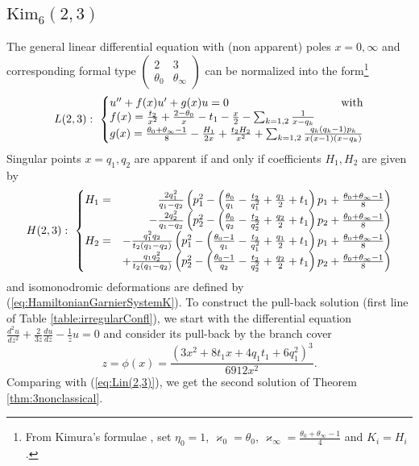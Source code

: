 \documentclass[12]{amsart}
\begin{document}
\subsection{$\mathrm{Kim}_6(2,3)$}
The general linear differential equation with (non apparent) poles $x=0,\infty$
and corresponding formal type $\begin{pmatrix}2&3\\ \theta_0&\theta_\infty\end{pmatrix}$ can be normalized into the form\footnote{From Kimura's formulae \cite{Kimura}, set $\eta_0=1$, 
$\varkappa_0=\theta_0$, $\varkappa_\infty=\frac{\theta_0+\theta_\infty-1}{4}$
and $K_i=H_i$.}
\begin{equation}\label{eq:Lin(2,3)}
L(2,3):\ \left\{\begin{matrix}u''+f(x)u'+g(x)u=0\ \ \ \hfill\text{with}\\
f(x)=\frac{t_2}{x^2}+\frac{2-\theta_0}{x}-t_1-\frac{x}{2}-\sum_{k=1,2}\frac{1}{x-q_k}\hfill\hfill\\
g(x)=\frac{\theta_0+\theta_\infty-1}{8}-\frac{H_1}{2x}+\frac{t_2H_2}{x^2}+\sum_{k=1,2}\frac{q_k(q_k-1)p_k}{x(x-1)(x-q_k)}
\end{matrix}\right.
\end{equation}
Singular points $x=q_1,q_2$ are apparent if and only if coefficients $H_1,H_2$ are given by
\begin{equation}\label{eq:Ham(2,3)}
H(2,3):\ \left\{\begin{matrix}
H_1=&\hfill\frac{2q_1^2}{q_1-q_2}\left(p_1^2-\left(\frac{\theta_0}{q_1}-\frac{t_2}{q_1^2}+\frac{q_1}{2}+t_1\right)p_1+\frac{\theta_0+\theta_\infty-1}{8}\right)\\
&\hfill-\frac{2q_2^2}{q_1-q_2}\left(p_2^2-\left(\frac{\theta_0}{q_2}-\frac{t_2}{q_2^2}+\frac{q_2}{2}+t_1\right)p_2+\frac{\theta_0+\theta_\infty-1}{8}\right)\\
H_2=&-\frac{q_1^2q_2}{t_2(q_1-q_2)}\left(p_1^2-\left(\frac{\theta_0-1}{q_1}-\frac{t_2}{q_1^2}+\frac{q_1}{2}+t_1\right)p_1+\frac{\theta_0+\theta_\infty-1}{8}\right)\\
&\hfill+\frac{q_1q_2^2}{t_2(q_1-q_2)}\left(p_2^2-\left(\frac{\theta_0-1}{q_2}-\frac{t_2}{q_2^2}+\frac{q_2}{2}+t_1\right)p_2+\frac{\theta_0+\theta_\infty-1}{8}\right)
\end{matrix}\right.
\end{equation}
and isomonodromic deformations are defined by (\ref{eq:HamiltonianGarnierSystemK}).
To construct the pull-back solution (first line of Table \ref{table:irregularConfl}),
we start with the differential equation  $\frac{d^2u}{d z^2}+\frac{2}{3z}\frac{du}{d z}-\frac{1}{z}u=0$ 
and consider its pull-back 
by the branch cover
$$z=\phi(x)=\frac{(3x^2+8t_1x+4q_1t_1+6q_1^2)^3}{6912x^2}.$$
Comparing with (\ref{eq:Lin(2,3)}), we get the second solution of Theorem \ref{thm:3nonclassical}.
\end{document}
